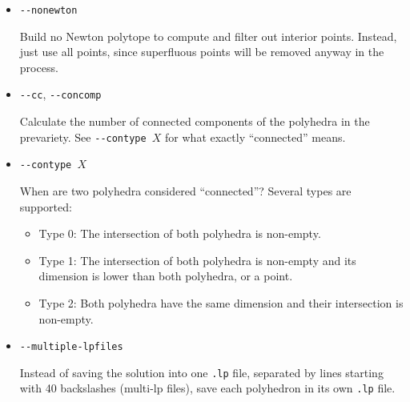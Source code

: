 \documentclass[a4paper,11pt]{article}
\begin{document}
\begin{itemize}
\item \texttt{-{}-nonewton}\par
Build no Newton polytope to compute and filter out interior points.
Instead, just use all points, since superfluous points will be removed anyway in the process.

\item \texttt{-{}-cc}, \texttt{-{}-concomp}\par
Calculate the number of connected components of the polyhedra in the prevariety.
See \texttt{-{}-contype~$X$} for what exactly ``connected'' means.

\item \texttt{-{}-contype~$X$}\par
When are two polyhedra considered ``connected''? Several types are supported:

\begin{itemize}
\item Type 0: The intersection of both polyhedra is non-empty.
\item Type 1: The intersection of both polyhedra is non-empty and its dimension is lower than both polyhedra, or a point.
\item Type 2: Both polyhedra have the same dimension and their intersection is non-empty.
\end{itemize}

\item \texttt{-{}-multiple-lpfiles}\par
Instead of saving the solution into one \texttt{.lp} file, separated by lines starting with 40 backslashes
(multi-lp files), save each polyhedron in its own \texttt{.lp} file.

\end{itemize}

%
%
\end{document}
